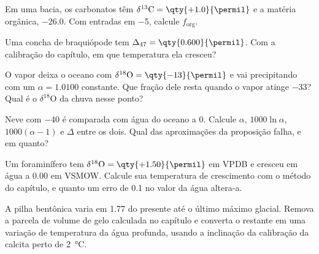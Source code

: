 \begin{exercise}[$\star$]\label{exo:b3:stable-isotopes:3}
Em uma bacia, os carbonatos têm $\delta^{13}\mathrm C = \qty{+1.0}{\permil}$ e a matéria
orgânica, \qty{-26.0}{\permil}. Com entradas em \qty{-5}{\permil}, calcule
$f_{\mathrm{org}}$.
\end{exercise}

\begin{exercise}[$\star$]\label{exo:b3:stable-isotopes:4}
Uma concha de braquiópode tem $\Delta_{47} = \qty{0.600}{\permil}$. Com a calibração
do capítulo, em que temperatura ela cresceu?
\end{exercise}

\begin{exercise}[$\star\star$]\label{exo:b3:stable-isotopes:5}
O vapor deixa o oceano com $\delta^{18}\mathrm O = \qty{-13}{\permil}$ e vai precipitando
com um $\alpha = 1.0100$ constante. Que fração dele resta quando o
vapor atinge \qty{-33}{\permil}? Qual é o $\delta^{18}\mathrm O$ da chuva
nesse ponto?
\end{exercise}

\begin{exercise}[$\star\star$]\label{exo:b3:stable-isotopes:6}
Neve com \qty{-40}{\permil} é comparada com água do oceano a 0. Calcule $\alpha$,
$1000\ln\alpha$, $1000(\alpha - 1)$ e $\Delta$ entre os dois. Qual das
aproximações da proposição falha, e em quanto?
\end{exercise}

\begin{exercise}[$\star\star$]\label{exo:b3:stable-isotopes:7}
Um foraminífero tem $\delta^{18}\mathrm O = \qty{+1.50}{\permil}$ em VPDB e cresceu em
água a \qty{0.00}{\permil} em VSMOW. Calcule sua temperatura de crescimento com o
método do capítulo, e quanto um erro de \qty{0.1}{\permil} no valor da
água altera-a.
\end{exercise}

\begin{exercise}[$\star\star$]\label{exo:b3:stable-isotopes:8}
A pilha bentônica varia em \qty{1.77}{\permil} do presente até o último
máximo glacial. Remova a parcela de volume de gelo calculada no capítulo e
converta o restante em uma variação de temperatura da água profunda, usando a inclinação da
calibração da calcita perto de \qty{2}{\celsius}.
\end{exercise}

